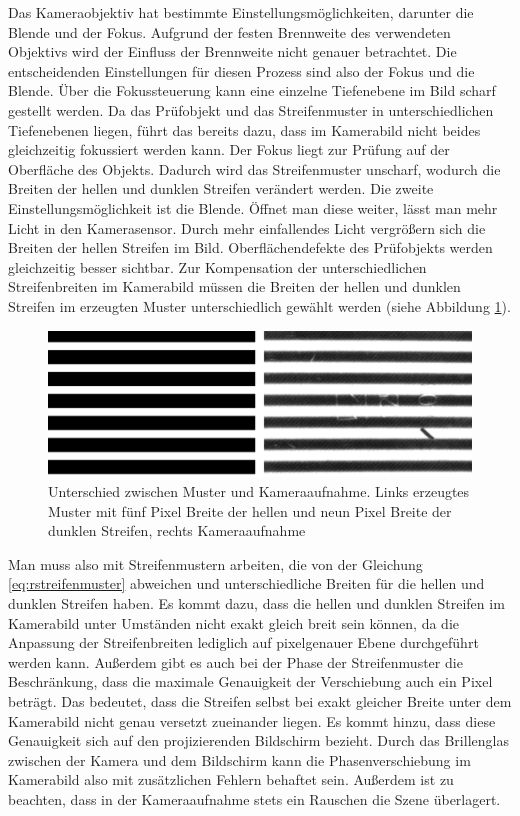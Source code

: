Das Kameraobjektiv hat bestimmte Einstellungsmöglichkeiten, darunter die Blende und der Fokus.
Aufgrund der festen Brennweite des verwendeten Objektivs wird der Einfluss der Brennweite nicht genauer betrachtet.
Die entscheidenden Einstellungen für diesen Prozess sind also der Fokus und die Blende.
Über die Fokussteuerung kann eine einzelne Tiefenebene im Bild scharf gestellt werden.
Da das Prüfobjekt und das Streifenmuster in unterschiedlichen Tiefenebenen liegen, führt das bereits dazu, dass im Kamerabild nicht beides gleichzeitig fokussiert werden kann.
Der Fokus liegt zur Prüfung auf der Oberfläche des Objekts.
Dadurch wird das Streifenmuster unscharf, wodurch die Breiten der hellen und dunklen Streifen verändert werden.
Die zweite Einstellungsmöglichkeit ist die Blende.
Öffnet man diese weiter, lässt man mehr Licht in den Kamerasensor.
Durch mehr einfallendes Licht vergrößern sich die Breiten der hellen Streifen im Bild.
Oberflächendefekte des Prüfobjekts werden gleichzeitig besser sichtbar.
Zur Kompensation der unterschiedlichen Streifenbreiten im Kamerabild müssen die Breiten der hellen und dunklen Streifen im erzeugten Muster unterschiedlich gewählt werden (siehe Abbildung \ref{img:differenceCamPat}).

\begin{figure}[H]
	\centering
	\includegraphics[width=\textwidth]{03_sichtpruefungDurchLichtstreuung/optimierungen/unterschiedeKameraUndMonitor/figures/differenceCameraPattern}
	\caption[Unterschied zwischen Muster und Kameraaufnahme]{Unterschied zwischen Muster und Kameraaufnahme. Links erzeugtes Muster mit fünf Pixel Breite der hellen und neun Pixel Breite der dunklen Streifen, rechts Kameraaufnahme}
	\label{img:differenceCamPat}
\end{figure}

\noindent
Man muss also mit Streifenmustern arbeiten, die von der Gleichung \ref{eq:rstreifenmuster} abweichen und unterschiedliche Breiten für die hellen und dunklen Streifen haben.
Es kommt dazu, dass die hellen und dunklen Streifen im Kamerabild unter Umständen nicht exakt gleich breit sein können, da die Anpassung der Streifenbreiten lediglich auf pixelgenauer Ebene durchgeführt werden kann.
Außerdem gibt es auch bei der Phase der Streifenmuster die Beschränkung, dass die maximale Genauigkeit der Verschiebung auch ein Pixel beträgt.
Das bedeutet, dass die Streifen selbst bei exakt gleicher Breite unter dem Kamerabild nicht genau versetzt zueinander liegen.
Es kommt hinzu, dass diese Genauigkeit sich auf den projizierenden Bildschirm bezieht.
Durch das Brillenglas zwischen der Kamera und dem Bildschirm kann die Phasenverschiebung im Kamerabild also mit zusätzlichen Fehlern behaftet sein.
Außerdem ist zu beachten, dass in der Kameraaufnahme stets ein Rauschen die Szene überlagert.